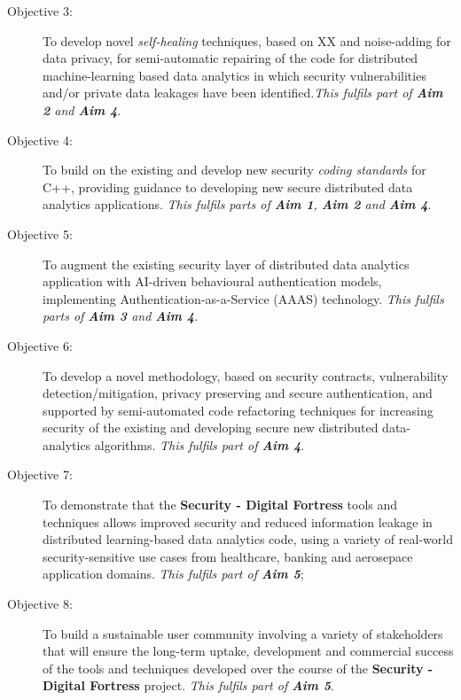 \documentclass[a4paper,11pt]{article}
\newcommand{\project}[1]{\textbf{#1}\xspace}
\newcommand{\SECURITY}{\project{Security - Digital Fortress}}
\newcommand{\TheProject}{\SECURITY}
\begin{document}
\begin{description}
\item[Objective 3:] To develop novel \emph{self-healing} techniques, based on XX and noise-adding for data privacy, for semi-automatic repairing of the code for distributed machine-learning based data analytics in which security vulnerabilities and/or private data leakages have been identified.\emph{This fulfils part of \textbf{Aim 2} and \textbf{Aim 4}}.

\item[Objective 4:] To build on the existing and develop new security \emph{coding standards} for C++, providing guidance to developing new secure distributed data analytics applications. \emph{This fulfils parts of \textbf{Aim 1}, \textbf{Aim 2} and \textbf{Aim 4}}.

\item[Objective 5:] To augment the existing security layer of distributed data analytics application with AI-driven behavioural authentication models, implementing Authentication-as-a-Service (AAAS) technology. \emph{This fulfils parts of \textbf{Aim 3} and \textbf{Aim 4}}.

\item[Objective 6:] To develop a novel methodology, based on security contracts, vulnerability detection/mitigation,
  privacy preserving and secure authentication, and supported by semi-automated code refactoring techniques for
  increasing security of the existing and developing secure new distributed data-analytics algorithms. \emph{This fulfils
    part of \textbf{Aim 4}}.

\item[Objective 7:] To demonstrate that the \TheProject{} tools and techniques allows improved security and reduced
  information leakage in distributed learning-based data analytics code, using a variety of real-world security-sensitive
  use cases from healthcare, banking and aerosepace application domains. \emph{This fulfils part of \textbf{Aim 5}};

\item[Objective 8:] To build a sustainable user community involving a variety of stakeholders that will ensure the long-term
  uptake, development and commercial success of the tools and techniques developed over the course of the \TheProject{}
  project. \emph{This fulfils part of \textbf{Aim 5}}.

\end{description}
\end{document}

